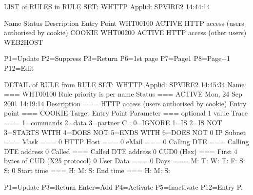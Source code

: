 \documentclass[letterpaper,10pt,english]{sphinxmanual}
\begin{document}
\begin{sphinxVerbatim}[commandchars=\\\{\}]
LIST of RULES in RULE SET: W\PYGZhy{}HTTP \PYGZhy{}\PYGZhy{}\PYGZhy{}\PYGZhy{}\PYGZhy{}\PYGZhy{}\PYGZhy{}\PYGZhy{}\PYGZhy{}\PYGZhy{}\PYGZhy{}\PYGZhy{}\PYGZhy{}\PYGZhy{}\PYGZhy{}\PYGZhy{} Applid: SPVIRE2     14:44:14

Name     Status   Description                                        Entry
                                                                     Point
WHT00100 ACTIVE   HTTP access (users authorised by cookie)           \PYGZdl{}COOKIE\PYGZdl{}
WHT00200 ACTIVE   HTTP access (other users)                          WEB2HOST

P1=Update            P2=Suppress             P3=Return
P6=1st page          P7=Page\PYGZhy{}1               P8=Page+1              P12=Edit
\end{sphinxVerbatim}

\sphinxAtStartPar
{}

\begin{sphinxVerbatim}[commandchars=\\\{\}]
DETAIL of RULE from RULE SET: W\PYGZhy{}HTTP \PYGZhy{}\PYGZhy{}\PYGZhy{}\PYGZhy{}\PYGZhy{}\PYGZhy{}\PYGZhy{}\PYGZhy{}\PYGZhy{}\PYGZhy{}\PYGZhy{}\PYGZhy{}\PYGZhy{} Applid: SPVIRE2 14:45:34
Name          ===\PYGZgt{} WHT00100              Rule priority is per name
Status        ===\PYGZgt{} ACTIVE                Mon, 24 Sep 2001 14:19:14
Description   ===\PYGZgt{} HTTP access (users authorised by cookie)
Entry point   ===\PYGZgt{} \PYGZdl{}COOKIE\PYGZdl{}              Target Entry Point
Parameter     ===\PYGZgt{}                                  optional \PYGZam{}1 value
Trace         ===\PYGZgt{}                       1=commands 2=data 3=partner
C : 0=IGNORE 1=IS 2=IS NOT 3=STARTS WITH 4=DOES NOT 5=ENDS WITH 6=DOES NOT
0 IP Subnet   ===\PYGZgt{}                       Mask ===\PYGZgt{}
0 HTTP Host   ===\PYGZgt{}
0 eMail       ===\PYGZgt{}
0 Calling DTE ===\PYGZgt{}                       Calling DTE address
0 Called      ===\PYGZgt{}                       Called DTE address
0 CUD0 (Hex)  ===\PYGZgt{}                       First 4 bytes of CUD (X25 protocol)
0 User Data   ===\PYGZgt{}
0 Days        ===\PYGZgt{} M:      T:      W:      T:      F:      S:      S:
0 Start time  ===\PYGZgt{} H:      M:      S:     End time ===\PYGZgt{} H:     M:     S:

P1=Update                          P3=Return                    Enter=Add
P4=Activate                        P5=Inactivate                P12=Entry P.
\end{sphinxVerbatim}
\end{document}
